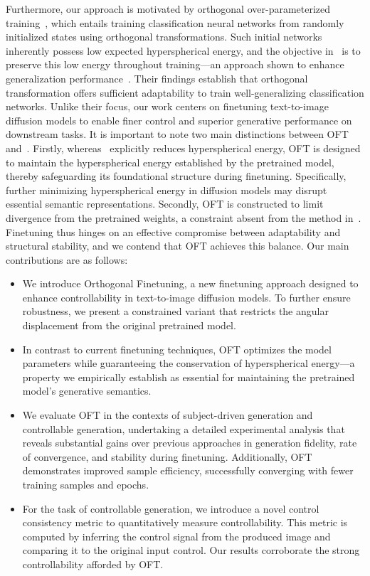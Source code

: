 Furthermore, our approach is motivated by orthogonal over-parameterized training~\cite{liu2021orthogonal}, which entails training classification neural networks from randomly initialized states using orthogonal transformations. Such initial networks inherently possess low expected hyperspherical energy, and the objective in~\cite{liu2021orthogonal} is to preserve this low energy throughout training—an approach shown to enhance generalization performance~\cite{liu2018learning,lin2020regularizing}. Their findings establish that orthogonal transformation offers sufficient adaptability to train well-generalizing classification networks. Unlike their focus, our work centers on finetuning text-to-image diffusion models to enable finer control and superior generative performance on downstream tasks. It is important to note two main distinctions between OFT and~\cite{liu2021orthogonal}. Firstly, whereas~\cite{liu2021orthogonal} explicitly reduces hyperspherical energy, OFT is designed to maintain the hyperspherical energy established by the pretrained model, thereby safeguarding its foundational structure during finetuning. Specifically, further minimizing hyperspherical energy in diffusion models may disrupt essential semantic representations. Secondly, OFT is constructed to limit divergence from the pretrained weights, a constraint absent from the method in~\cite{liu2021orthogonal}. Finetuning thus hinges on an effective compromise between adaptability and structural stability, and we contend that OFT achieves this balance. Our main contributions are as follows:

\begin{itemize}[leftmargin=*,nosep]

    \item We introduce Orthogonal Finetuning, a new finetuning approach designed to enhance controllability in text-to-image diffusion models. To further ensure robustness, we present a constrained variant that restricts the angular displacement from the original pretrained model.
    \item In contrast to current finetuning techniques, OFT optimizes the model parameters while guaranteeing the conservation of hyperspherical energy—a property we empirically establish as essential for maintaining the pretrained model’s generative semantics.
    \item We evaluate OFT in the contexts of subject-driven generation and controllable generation, undertaking a detailed experimental analysis that reveals substantial gains over previous approaches in generation fidelity, rate of convergence, and stability during finetuning. Additionally, OFT demonstrates improved sample efficiency, successfully converging with fewer training samples and epochs.
    \item For the task of controllable generation, we introduce a novel control consistency metric to quantitatively measure controllability. This metric is computed by inferring the control signal from the produced image and comparing it to the original input control. Our results corroborate the strong controllability afforded by OFT.
\end{itemize}

